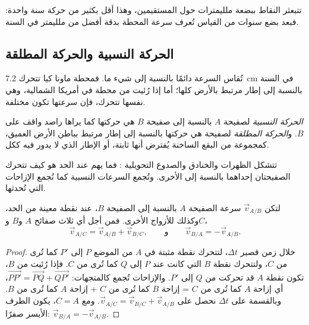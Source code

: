 تتبعثر النقاط ببضعة ملليمترات حول المستقيمين، وهذا أقل بكثير من
حركة سنة واحدة: فبعد بضع سنوات من القياس تُعرف سرعة
المحطة بدقة أفضل من ملليمتر في السنة.

\subsection{الحركة النسبية والحركة المطلقة}

تُقاس السرعة دائمًا بالنسبة إلى شيء ما. فمحطة ماونا كيا
تتحرك \qty{7.2}{cm} في السنة بالنسبة إلى إطار مرتبط
بالأرض كلها؛ أما إذا رُئيت من محطة في أمريكا الشمالية، وهي نفسها تتحرك، فإن
سرعتها تكون مختلفة.

\begin{definition}\label{def:g11:plate-motions:relative-motion}
\emph{الحركة النسبية} لصفيحة $A$
بالنسبة إلى صفيحة $B$ هي حركتها كما يراها راصد واقف على $B$.
و\emph{الحركة المطلقة} لصفيحة هي حركتها
بالنسبة إلى إطار مرتبط بباطن الأرض العميق، كمجموعة من
البقع الساخنة يُفترض أنها ثابتة، أو الإطار الذي لا يدور فيه 
ككل.
\end{definition}

تتشكل الظهرات والخنادق والصدوع التحويلية : فما
يهم عند الحد هو كيف تتحرك الصفيحتان إحداهما بالنسبة إلى الأخرى.
وتُجمع السرعات النسبية كما تُجمع الإزاحات التي تُحدثها.

\begin{proposition}\label{prop:g11:plate-motions:sum}
لتكن $\vec v_{A/B}$ سرعة الصفيحة $A$ بالنسبة إلى الصفيحة $B$، عند
نقطة معينة من الحد، وكذلك للأزواج الأخرى. فمن أجل أي ثلاث
صفائح $A$ و$B$ و$C$،
\[
  \vec v_{A/C} = \vec v_{A/B} + \vec v_{B/C},
  \qquad\text{و}\qquad
  \vec v_{B/A} = -\vec v_{A/B}.
\]
\end{proposition}

\begin{proof}
خلال زمن قصير $\Delta t$، لتتحرك نقطة مثبتة في $A$ من الموضع $P$
إلى $P'$ كما تُرى من $C$، ولتتحرك نقطة $B$ التي كانت عند $P$ إلى
$Q$ كما تُرى من $C$. فإذا رُئيت من $B$، تكون نقطة $A$ قد تحركت من $Q$ إلى
$P'$. والإزاحات تُجمع كالمتجهات:
$\overrightarrow{PP'} = \overrightarrow{PQ} + \overrightarrow{QP'}$، أي
إزاحة $A$ كما تُرى من $C$ = إزاحة $B$ كما تُرى من $C$ +
إزاحة $A$ كما تُرى من $B$. وبالقسمة على $\Delta t$ نحصل على $\vec v_{A/C}
= \vec v_{B/C} + \vec v_{A/B}$. ومع $C = A$، يكون الطرف الأيسر صفرًا: $\vec
v_{B/A} = -\vec v_{A/B}$.
\end{proof}

